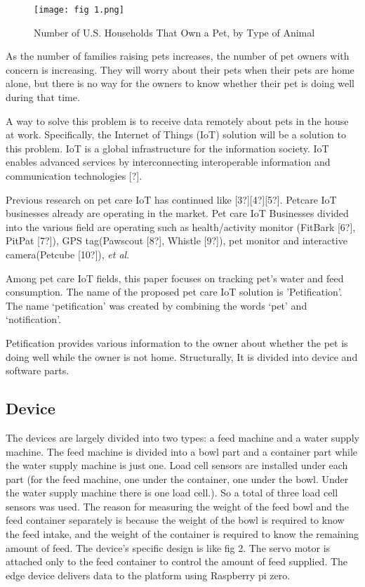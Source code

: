 \documentclass[conference]{IEEEtran}
\begin{document}
\begin{figure}[htbp]
\centerline{\texttt{[image: fig 1.png]}}
\caption{Number of U.S. Households That Own a Pet, by Type of Animal
}
\label{fig}
\end{figure}

 As the number of families raising pets increases, the number of pet owners with concern is increasing. They will worry about their pets when their pets are home alone, but there is no way for the owners to know whether their pet is doing well during that time.

A way to solve this problem is to receive data remotely about pets in the house at work. Specifically, the Internet of Things (IoT) solution will be a solution to this problem. IoT is a global infrastructure for the information society. IoT enables advanced services by interconnecting interoperable information and communication technologies [?].

Previous research on pet care IoT has continued like [3?][4?][5?]. Petcare IoT businesses already are operating in the market. Pet care IoT Businesses divided into the various field are operating such as health/activity monitor (FitBark [6?], PitPat [7?]), GPS tag(Pawscout [8?], Whistle [9?]),
pet monitor and interactive camera(Petcube [10?]), \textit{et al}.

 Among pet care IoT fields, this paper focuses on tracking pet’s water and feed consumption. The name of the proposed pet care IoT solution is 'Petification'. The name ‘petification’ was created by combining the words ‘pet’ and ‘notification’.
 
Petification provides various information to the owner about whether the pet is doing well while the owner is not home. Structurally, It is divided into device and software parts.

\subsection{Device}
The devices are largely divided into two types: a feed machine and a water supply machine. The feed machine is divided into a bowl part and a container part while the water supply machine is just one. Load cell sensors are installed under each part (for the feed machine, one under the container, one under the bowl. Under the water supply machine there is one load cell.). So a total of three load cell sensors was used. The reason for measuring the weight of the feed bowl and the feed container separately is because the weight of the bowl is required to know the feed intake, and the weight of the container is required to know the remaining amount of feed. The device's specific design is like fig 2. The servo motor is attached only to the feed container to control the amount of feed supplied. The edge device delivers data to the platform using Raspberry pi zero.
\end{document}
